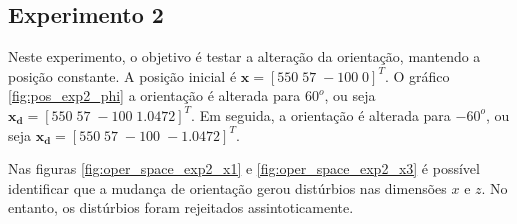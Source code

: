\subsection{Experimento 2}

Neste experimento, o objetivo é testar a alteração da orientação, mantendo a posição constante. A posição inicial é $\bm{x} =[ 550 \; 57 \; -100 \; 0]^T$. O gráfico \ref{fig:pos_exp2_phi} a orientação é alterada para $60^o$, ou seja $\bm{x_d} =[ 550 \; 57 \; -100 \; 1.0472]^T$. Em seguida, a orientação é alterada para $-60^o$, ou seja $\bm{x_d} =[ 550 \; 57 \; -100 \; -1.0472]^T$. 

Nas figuras \ref{fig:oper_space_exp2_x1} e \ref{fig:oper_space_exp2_x3} é possível identificar que a mudança de orientação gerou distúrbios nas dimensões $x$ e $z$. No entanto, os distúrbios foram rejeitados assintoticamente.

